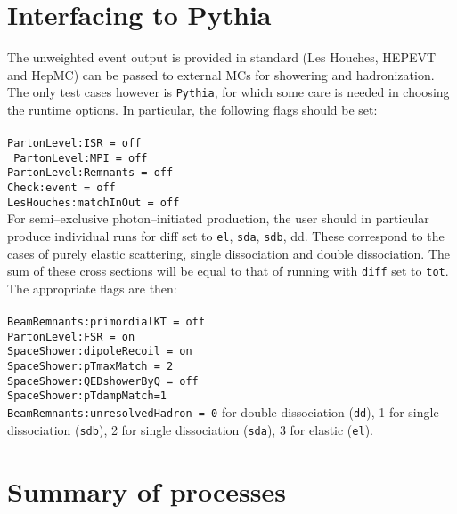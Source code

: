 \documentclass[12pt]{article}
\begin{document}
\section{Interfacing to Pythia}

The unweighted event output is provided in standard (Les Houches, HEPEVT and HepMC) can be passed to external MCs for showering and 
hadronization. The only test cases however is \texttt{Pythia}, for which some care is needed in choosing the runtime options. In particular, 
the following flags should be set:
\\
\\
 \texttt{PartonLevel:ISR = off}\\
 \texttt{ PartonLevel:MPI = off}\\
 \texttt{PartonLevel:Remnants = off}\\
 \texttt{Check:event = off}\\
 \texttt{LesHouches:matchInOut = off}\\
 
 For semi--exclusive photon--initiated production, the user should in particular produce individual runs for diff set to \texttt{el}, 
 \texttt{sda}, \texttt{sdb}, dd. These correspond to the cases of purely elastic scattering, single dissociation and double dissociation.
  The sum of these cross sections will be equal to that of running with \texttt{diff} set to \texttt{tot}. The appropriate flags are then:
 \\
\\
\texttt{BeamRemnants:primordialKT = off}\\
\texttt{PartonLevel:FSR = on}\\
\texttt{SpaceShower:dipoleRecoil = on} \\
\texttt{SpaceShower:pTmaxMatch = 2} \\
\texttt{SpaceShower:QEDshowerByQ = off} \\
\texttt{SpaceShower:pTdampMatch=1} \\
\texttt{BeamRemnants:unresolvedHadron = 0} for double dissociation (\texttt{dd}), 1 for single dissociation (\texttt{sdb}), 2 for single 
dissociation (\texttt{sda}), 3 for elastic (\texttt{el}). \\

\section{Summary of processes}\label{sec:proc}
\end{document}
